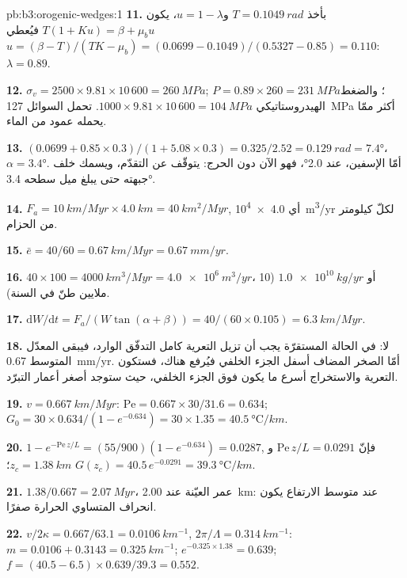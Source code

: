 \begin{solution}{pb:b3:orogenic-wedges:1}
\textbf{11.} بأخذ $T = \qty{0.1049}{rad}$ و$u = 1 - \lambda$، يكون $T(1 + Ku) =
\beta + \mu_bu$ فيُعطي $u = (\beta - T)/(TK - \mu_b) = (0.0699 -
0.1049)/(0.5327 - 0.85) = 0.110$: $\lambda = 0.89$.

\textbf{12.} $\sigma_v = 2500\times9.81\times10\,600 = \qty{260}{MPa}$; $P =
0.89\times260 = \qty{231}{MPa}$؛ والضغط الهيدروستاتيكي $1000\times9.81\times10\,600 =
\qty{104}{MPa}$. تحمل السوائل \qty{127}{MPa} أكثر ممّا يحمله عمود
من الماء.

\textbf{13.} $(0.0699 + 0.85\times0.3)/(1 + 5.08\times0.3) = 0.325/2.52 =
\qty{0.129}{rad} = \ang{7.4}$، $\alpha = \ang{3.4}$. أمّا الإسفين، عند \ang{2.0}،
فهو الآن دون الحرج: يتوقّف عن التقدّم، ويسمك 
خلف جبهته حتى يبلغ ميل سطحه \ang{3.4}.

\textbf{14.} $F_a = \qty{10}{km/Myr}\times\qty{4.0}{km} = \qty{40}{km^2/Myr}$,
أي \qty{4.0e4}{m^3/yr} لكلّ كيلومتر من الحزام.

\textbf{15.} $\bar e = 40/60 = \qty{0.67}{km/Myr} = \qty{0.67}{mm/yr}$.

\textbf{16.} $40\times100 = \qty{4000}{km^3/Myr} = \qty{4.0e6}{m^3/yr}$، أو
$\qty{1.0e10}{kg/yr}$ (10 ملايين طنّ في السنة).

\textbf{17.} $\mathrm dW/\mathrm dt = F_a/(W\tan(\alpha + \beta)) =
40/(60\times0.105) = \qty{6.3}{km/Myr}$.

\textbf{18.} لا: في الحالة المستقرّة يجب أن تزيل التعرية كامل
التدفّق الوارد، فيبقى المعدّل المتوسط \qty{0.67}{mm/yr}. أمّا الصخر المضاف
أسفل الجزء الخلفي فيُرفع هناك، فستكون التعرية والاستخراج أسرع ما يكون
فوق الجزء الخلفي، حيث ستوجد أصغر أعمار التبرّد.

\textbf{19.} $v = \qty{0.667}{km/Myr}$: $\mathrm{Pe} = 0.667\times30/31.6 =
0.634$; $G_0 = 30\times0.634/(1 - e^{-0.634}) = 30\times1.35 =
\qty{40.5}{\celsius/km}$.

\textbf{20.} $1 - e^{-\mathrm{Pe}\,z/L} = (55/900)(1 - e^{-0.634}) = 0.0287$,
فإنّ $\mathrm{Pe}\,z/L = 0.0291$ و$z_c = \qty{1.38}{km}$؛ $G(z_c) =
40.5\,e^{-0.0291} = \qty{39.3}{\celsius/km}$.

\textbf{21.} $1.38/0.667 = \qty{2.07}{Myr}$، عمر العيّنة عند
\qty{2.00}{km}: عند متوسط الارتفاع يكون انحراف المتساوي الحرارة صفرًا.

\textbf{22.} $v/2\kappa = 0.667/63.1 = \qty{0.0106}{km^{-1}}$, $2\pi/\Lambda =
\qty{0.314}{km^{-1}}$: $m = 0.0106 + 0.3143 = \qty{0.325}{km^{-1}}$;
$e^{-0.325\times1.38} = 0.639$; $f = (40.5 - 6.5)\times0.639/39.3 = 0.552$.


\end{solution}
